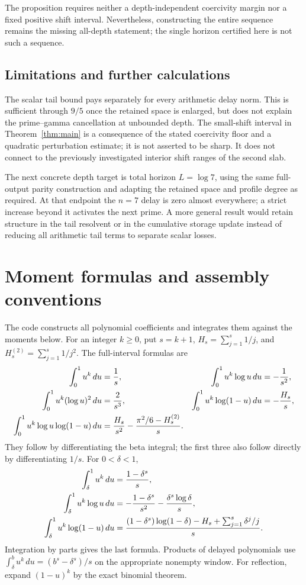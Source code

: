 \documentclass[11pt]{article}
\numberwithin{equation}{section}
\theoremstyle{definition}
\theoremstyle{remark}
\begin{document}
The proposition requires neither a depth-independent coercivity margin nor
a fixed positive shift interval. Nevertheless, constructing the entire
sequence remains the missing all-depth statement; the single horizon
certified here is not such a sequence.

\subsection{Limitations and further calculations}

The scalar tail bound pays separately for every arithmetic delay norm.
This is sufficient through $9/5$ once the retained space is enlarged, but
does not explain the prime--gamma cancellation at unbounded depth. The
small-shift interval in Theorem~\ref{thm:main} is a consequence of the stated
coercivity floor and a quadratic perturbation estimate; it is not asserted
to be sharp. It does not connect to the previously investigated interior
shift ranges of the second slab.

The next concrete depth target is total horizon $L=\log7$, using the same
full-output parity construction and adapting the retained space and profile
degree as required. At that endpoint the $n=7$ delay is zero almost
everywhere; a strict increase beyond it activates the next prime. A more
general result would retain structure in the tail resolvent or in the
cumulative storage update instead of reducing all arithmetic tail terms
to separate scalar losses.

\appendix
\section{Moment formulas and assembly conventions}\label{app:moments}

The code constructs all polynomial coefficients and integrates them against
the moments below. For an integer $k\ge0$, put $s=k+1$,
$H_s=\sum_{j=1}^s1/j$, and $H_s^{(2)}=\sum_{j=1}^s1/j^2$.
The full-interval formulas are
\begin{align}
 \int_0^1u^k\,du&=\frac1s,&
 \int_0^1u^k\log u\,du&=-\frac1{s^2},\notag\\
 \int_0^1u^k(\log u)^2\,du&=\frac2{s^3},&
 \int_0^1u^k\log(1-u)\,du&=-\frac{H_s}{s},\label{eq:moments}\\
 \int_0^1u^k\log u\log(1-u)\,du
 &=\frac{H_s}{s^2}-\frac{\pi^2/6-H_s^{(2)}}s.\notag
\end{align}
They follow by differentiating the beta integral; the first three also
follow directly by differentiating $1/s$.
For $0<\delta<1$,
\begin{align}
 \int_\delta^1u^k\,du&=\frac{1-\delta^s}s,\notag\\
 \int_\delta^1u^k\log u\,du
 &=-\frac{1-\delta^s}{s^2}-\frac{\delta^s\log\delta}s,\label{eq:tailmoments}\\
 \int_\delta^1u^k\log(1-u)\,du
 &=\frac{(1-\delta^s)\log(1-\delta)-H_s+\sum_{j=1}^s\delta^j/j}{s}.
 \notag
\end{align}
Integration by parts gives the last formula. Products of delayed
polynomials use
$\int_\delta^b u^k\,du=(b^s-\delta^s)/s$ on the appropriate nonempty
window. For reflection, expand $(1-u)^k$ by the exact binomial theorem.
\end{document}
